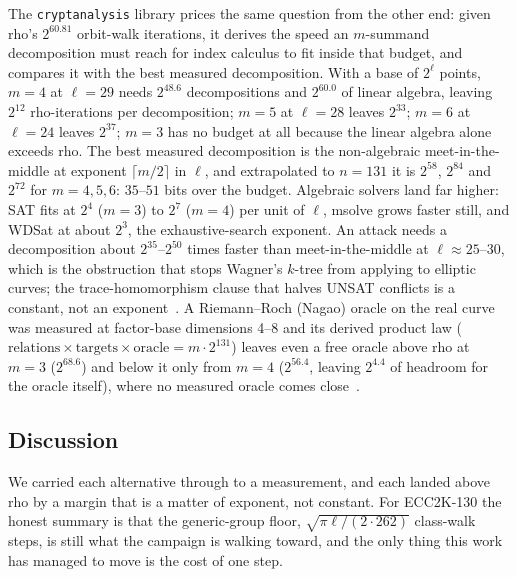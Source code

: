 The \texttt{cryptanalysis} library prices the same question from the other end:
given rho's $2^{60.81}$ orbit-walk iterations, it derives the speed an
$m$-summand decomposition must reach for index calculus to fit inside
that budget, and compares it with the best measured decomposition. With a base of
$2^\ell$ points, $m=4$ at $\ell=29$ needs $2^{48.6}$ decompositions and
$2^{60.0}$ of linear algebra, leaving $2^{12}$ rho-iterations per
decomposition; $m=5$ at $\ell=28$ leaves $2^{33}$; $m=6$ at $\ell=24$
leaves $2^{37}$; $m=3$ has no budget at all because the linear algebra
alone exceeds rho. The best measured decomposition is the
non-algebraic meet-in-the-middle at exponent $\lceil m/2\rceil$ in
$\ell$, and extrapolated to $n=131$ it is $2^{58}$, $2^{84}$ and $2^{72}$
for $m=4,5,6$: $35$--$51$ bits over the budget. Algebraic solvers land far higher: SAT fits at $2^{4}$ ($m=3$) to
$2^{7}$ ($m=4$) per unit of $\ell$, msolve grows faster still, and
WDSat at about $2^{3}$, the exhaustive-search exponent. An attack needs a decomposition about $2^{35}$--$2^{50}$
times faster than meet-in-the-middle at $\ell\approx25$--$30$, which is
the obstruction that stops Wagner's $k$-tree from applying to elliptic
curves; the trace-homomorphism clause that halves UNSAT conflicts is a
constant, not an exponent~.
A Riemann--Roch (Nagao) oracle on the real curve was measured at
factor-base dimensions 4--8 and its derived product law
($\text{relations}\times\text{targets}\times\text{oracle}=m\cdot2^{131}$)
leaves even a free oracle above rho at $m=3$ ($2^{68.6}$) and below it
only from $m=4$ ($2^{56.4}$, leaving $2^{4.4}$ of headroom for the
oracle itself), where no measured oracle comes close~.

\subsection{Discussion}

We carried each alternative through to a measurement, and each
landed above rho by a margin that is a matter of exponent, not
constant. For ECC2K-130 the honest summary is that the generic-group
floor, $\sqrt{\pi\ell/(2\cdot262)}$ class-walk steps, is still what
the campaign is walking toward, and the only thing this work has
managed to move is the cost of one step.
